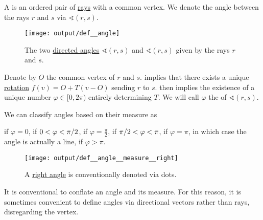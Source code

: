 \begin{definition}\label{def:angle}
  A  is an ordered pair of \hyperref[def:geometric_ray]{rays} with a common vertex. We denote the angle between the rays \( r \) and \( s \) via \( \sphericalangle(r, s) \).

  \begin{figure}[!ht]
    \centering
    \texttt{[image: output/def\_\_angle]}
    \caption{The two \hyperref[def:angle]{directed angles} \( \sphericalangle(r, s) \) and \( \sphericalangle(r, s) \) given by the rays \( r \) and \( s \).}\label{def:angle/measure/figure}
  \end{figure}

  \begin{thmenum}
     Denote by \( O \) the common vertex of \( r \) and \( s \).  implies that there exists a unique \hyperref[def:rigid_motion/rotation]{rotation} \( f(v) = O + T(v - O) \) sending \( r \) to \( s \).  then implies the existence of a unique number \( \varphi \in [0, 2\pi) \) entirely determining \( T \). We will call \( \varphi \) the  of \( \sphericalangle(r, s) \).

    We can classify angles based on their measure as
    \begin{thmenum}
        if \( \varphi = 0 \),
        if \( 0 < \varphi < \ifrac \pi 2 \),
        if \( \varphi = \tfrac \pi 2 \),
        if \( \ifrac \pi 2 < \varphi < \pi \),
        if \( \varphi = \pi \), in which case the angle is actually a line,
        if \( \varphi > \pi \).
    \end{thmenum}

    \begin{figure}[!ht]
      \centering
      \texttt{[image: output/def\_\_angle\_\_measure\_\_right]}
      \caption{A \hyperref[def:angle/measure/right]{right angle} is conventionally denoted via dots.}\label{fig:def:angle/measure/right}
    \end{figure}

     It is conventional to conflate an angle and its measure. For this reason, it is sometimes convenient to define angles via directional vectors rather than rays, disregarding the vertex.


\end{thmenum}
\end{definition}
